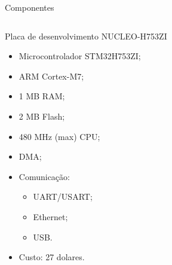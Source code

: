 \documentclass{if-beamer}
\begin{document}
\begin{frame}{Componentes}
	
		\begin{columns}
		
		\begin{column}{0.6\textwidth}
			
	\begin{block}{Placa de desenvolvimento NUCLEO-H753ZI}
	
	\begin{itemize}
		\item Microcontrolador STM32H753ZI;
		\item ARM Cortex-M7;
		\item 1 MB RAM;
		\item 2 MB Flash;
		\item 480 MHz (max) CPU;
		\item DMA;
		\item Comunicação:
		\begin{itemize}
			\item UART/USART;
			\item Ethernet;
			\item USB.
		\end{itemize}
		\item Custo: 27 dolares.
	\end{itemize}
	
\end{block}
			
		\end{column}
		
		\begin{column}{0.4\textwidth}
			

\end{column}
\end{columns}
\end{frame}
\end{document}
